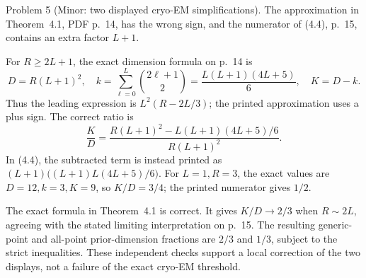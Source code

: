 \documentclass[10pt]{article}
\begin{document}
Problem 5 (Minor: two displayed cryo-EM simplifications).  The approximation in Theorem 4.1, PDF p. 14, has the wrong sign, and the numerator of (4.4), p. 15, contains an extra factor \(L+1\).\par
For \(R\ge2L+1\), the exact dimension formula on p. 14 is \[D=R(L+1)^2,\quad
 k=\sum_{\ell=0}^L\binom{2\ell+1}{2}
   =\frac{L(L+1)(4L+5)}6,\quad K=D-k.\] Thus the leading expression is \(L^2(R-2L/3)\); the printed approximation uses a plus sign. The correct ratio is \[\frac KD=
 \frac{R(L+1)^2-L(L+1)(4L+5)/6}{R(L+1)^2}.\] In (4.4), the subtracted term is instead printed as \((L+1)\bigl((L+1)L(4L+5)/6\bigr)\). For \(L=1,R=3\), the exact values are \(D=12,k=3,K=9\), so \(K/D=3/4\); the printed numerator gives \(1/2\).\par
The exact formula in Theorem 4.1 is correct. It gives \(K/D\to2/3\) when \(R\sim2L\), agreeing with the stated limiting interpretation on p. 15. The resulting generic-point and all-point prior-dimension fractions are \(2/3\) and \(1/3\), subject to the strict inequalities. These independent checks support a local correction of the two displays, not a failure of the exact cryo-EM threshold.\par
\end{document}
